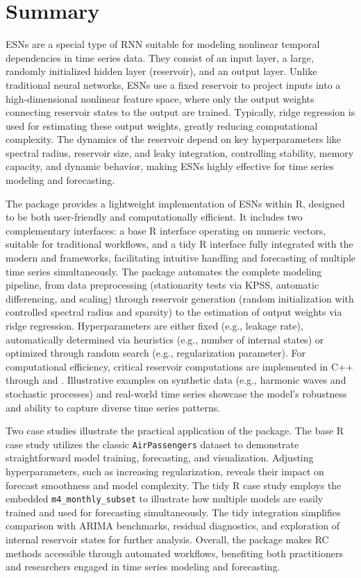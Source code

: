 \section{Summary}\label{summary}

ESNs are a special type of RNN suitable for modeling nonlinear temporal dependencies in time series data. They consist of an input layer, a large, randomly initialized hidden layer (reservoir), and an output layer. Unlike traditional neural networks, ESNs use a fixed reservoir to project inputs into a high-dimensional nonlinear feature space, where only the output weights connecting reservoir states to the output are trained. Typically, ridge regression is used for estimating these output weights, greatly reducing computational complexity. The dynamics of the reservoir depend on key hyperparameters like spectral radius, reservoir size, and leaky integration, controlling stability, memory capacity, and dynamic behavior, making ESNs highly effective for time series modeling and forecasting.

The  package provides a lightweight implementation of ESNs within R, designed to be both user-friendly and computationally efficient. It includes two complementary interfaces: a base R interface operating on numeric vectors, suitable for traditional workflows, and a tidy R interface fully integrated with the modern  and  frameworks, facilitating intuitive handling and forecasting of multiple time series simultaneously. The package automates the complete modeling pipeline, from data preprocessing (stationarity tests via KPSS, automatic differencing, and scaling) through reservoir generation (random initialization with controlled spectral radius and sparsity) to the estimation of output weights via ridge regression. Hyperparameters are either fixed (e.g., leakage rate), automatically determined via heuristics (e.g., number of internal states) or optimized through random search (e.g., regularization parameter). For computational efficiency, critical reservoir computations are implemented in C++ through  and . Illustrative examples on synthetic data (e.g., harmonic waves and stochastic processes) and real-world time series showcase the model's robustness and ability to capture diverse time series patterns.

Two case studies illustrate the practical application of the package. The base R case study utilizes the classic \texttt{AirPassengers} dataset to demonstrate straightforward model training, forecasting, and visualization. Adjusting hyperparameters, such as increasing regularization, reveals their impact on forecast smoothness and model complexity. The tidy R case study employs the embedded \texttt{m4\_monthly\_subset} to illustrate how multiple models are easily trained and used for forecasting simultaneously. The tidy integration simplifies comparison with ARIMA benchmarks, residual diagnostics, and exploration of internal reservoir states for further analysis. Overall, the  package makes RC methods accessible through automated workflows, benefiting both practitioners and researchers engaged in time series modeling and forecasting.

